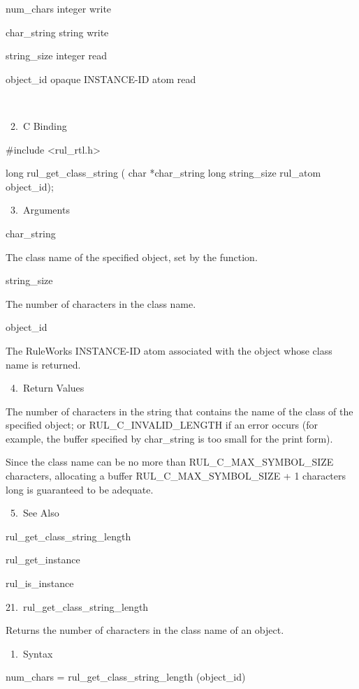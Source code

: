           num_chars  integer     write

          char_string  string     write

          string_size  integer     read

          object_id  opaque INSTANCE-ID atom
           read

           

       2. C Binding

          #include <rul_rtl.h>

          long rul_get_class_string (
          char *char_string
          long string_size
          rul_atom object_id);

       3. Arguments

          char_string

          The class name of the specified
          object, set by the function.

          string_size

          The number of characters in the
          class name.

          object_id

          The RuleWorks INSTANCE-ID atom
          associated with the object whose
          class name is returned.

       4. Return Values

          The number of characters in the
          string that contains the name of the
          class of the specified object; or
          RUL_C_INVALID_LENGTH if an error
          occurs (for example, the buffer
          specified by char_string is too
          small for the print form).

          Since the class name can be no more
          than RUL_C_MAX_SYMBOL_SIZE
          characters, allocating a buffer
          RUL_C_MAX_SYMBOL_SIZE + 1 characters
          long is guaranteed to be adequate.

       5. See Also

    rul_get_class_string_length

    rul_get_instance

    rul_is_instance

21. rul_get_class_string_length

    Returns the number of characters in the
    class name of an object.

       1. Syntax

          num_chars =
          rul_get_class_string_length
          (object_id)

